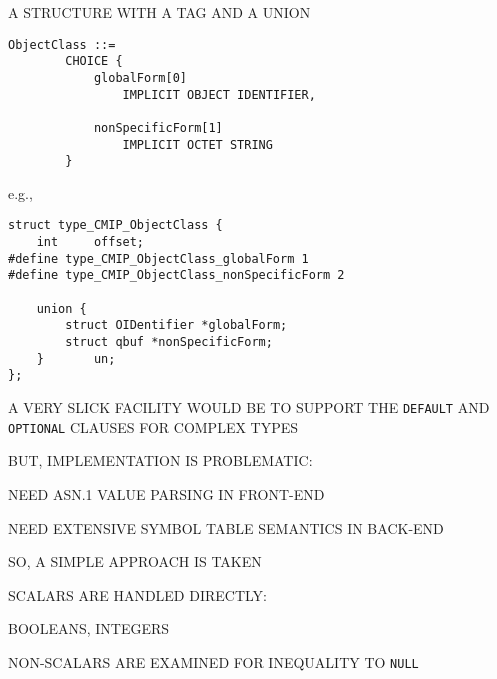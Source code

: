 \begin{bwslide}

\begin{nrtc}
\item	A STRUCTURE WITH A TAG AND A UNION
\begin{verbatim}
ObjectClass ::=
        CHOICE {
            globalForm[0]
                IMPLICIT OBJECT IDENTIFIER,

            nonSpecificForm[1]
                IMPLICIT OCTET STRING
        }
\end{verbatim}

e.g.,
\begin{verbatim}
struct type_CMIP_ObjectClass {
    int     offset;
#define type_CMIP_ObjectClass_globalForm 1
#define type_CMIP_ObjectClass_nonSpecificForm 2

    union {
        struct OIDentifier *globalForm;
        struct qbuf *nonSpecificForm;
    }       un;
};
\end{verbatim}
\end{nrtc}
\end{bwslide}


\begin{bwslide}

\begin{nrtc}
\item	A VERY SLICK FACILITY WOULD BE TO SUPPORT THE \verb"DEFAULT" AND
	\verb"OPTIONAL" CLAUSES FOR COMPLEX TYPES

\item	BUT, IMPLEMENTATION IS PROBLEMATIC:
    \begin{nrtc}
    \item	NEED ASN.1 VALUE PARSING IN FRONT-END

    \item	NEED EXTENSIVE SYMBOL TABLE SEMANTICS IN BACK-END
    \end{nrtc}

\item	SO, A SIMPLE APPROACH IS TAKEN
    \begin{nrtc}
    \item	SCALARS ARE HANDLED DIRECTLY:
	\begin{nrtc}
	\item	BOOLEANS, INTEGERS
	\end{nrtc}

    \item	NON-SCALARS ARE EXAMINED FOR INEQUALITY TO \verb"NULL"
    \end{nrtc}
\end{nrtc}
\end{bwslide}


